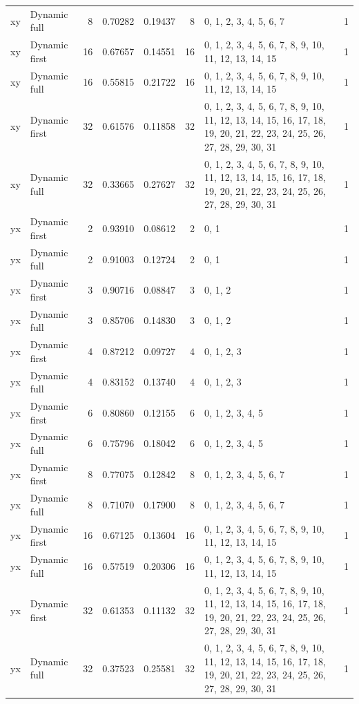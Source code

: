 \documentclass[10pt,a4paper]{article}
\begin{document}
\begin{longtable}{@{}p{23mm}p{29mm}rrrrp{36mm}r@{}}
xy & Dynamic full & 8 & 0.70282 & 0.19437 & 8 & 0, 1, 2, 3, 4, 5, 6, 7 & 1 \\
xy & Dynamic first & 16 & 0.67657 & 0.14551 & 16 & 0, 1, 2, 3, 4, 5, 6, 7, 8, 9, 10, 11, 12, 13, 14, 15 & 1 \\
xy & Dynamic full & 16 & 0.55815 & 0.21722 & 16 & 0, 1, 2, 3, 4, 5, 6, 7, 8, 9, 10, 11, 12, 13, 14, 15 & 1 \\
xy & Dynamic first & 32 & 0.61576 & 0.11858 & 32 & 0, 1, 2, 3, 4, 5, 6, 7, 8, 9, 10, 11, 12, 13, 14, 15, 16, 17, 18, 19, 20, 21, 22, 23, 24, 25, 26, 27, 28, 29, 30, 31 & 1 \\
xy & Dynamic full & 32 & 0.33665 & 0.27627 & 32 & 0, 1, 2, 3, 4, 5, 6, 7, 8, 9, 10, 11, 12, 13, 14, 15, 16, 17, 18, 19, 20, 21, 22, 23, 24, 25, 26, 27, 28, 29, 30, 31 & 1 \\
yx & Dynamic first & 2 & 0.93910 & 0.08612 & 2 & 0, 1 & 1 \\
yx & Dynamic full & 2 & 0.91003 & 0.12724 & 2 & 0, 1 & 1 \\
yx & Dynamic first & 3 & 0.90716 & 0.08847 & 3 & 0, 1, 2 & 1 \\
yx & Dynamic full & 3 & 0.85706 & 0.14830 & 3 & 0, 1, 2 & 1 \\
yx & Dynamic first & 4 & 0.87212 & 0.09727 & 4 & 0, 1, 2, 3 & 1 \\
yx & Dynamic full & 4 & 0.83152 & 0.13740 & 4 & 0, 1, 2, 3 & 1 \\
yx & Dynamic first & 6 & 0.80860 & 0.12155 & 6 & 0, 1, 2, 3, 4, 5 & 1 \\
yx & Dynamic full & 6 & 0.75796 & 0.18042 & 6 & 0, 1, 2, 3, 4, 5 & 1 \\
yx & Dynamic first & 8 & 0.77075 & 0.12842 & 8 & 0, 1, 2, 3, 4, 5, 6, 7 & 1 \\
yx & Dynamic full & 8 & 0.71070 & 0.17900 & 8 & 0, 1, 2, 3, 4, 5, 6, 7 & 1 \\
yx & Dynamic first & 16 & 0.67125 & 0.13604 & 16 & 0, 1, 2, 3, 4, 5, 6, 7, 8, 9, 10, 11, 12, 13, 14, 15 & 1 \\
yx & Dynamic full & 16 & 0.57519 & 0.20306 & 16 & 0, 1, 2, 3, 4, 5, 6, 7, 8, 9, 10, 11, 12, 13, 14, 15 & 1 \\
yx & Dynamic first & 32 & 0.61353 & 0.11132 & 32 & 0, 1, 2, 3, 4, 5, 6, 7, 8, 9, 10, 11, 12, 13, 14, 15, 16, 17, 18, 19, 20, 21, 22, 23, 24, 25, 26, 27, 28, 29, 30, 31 & 1 \\
yx & Dynamic full & 32 & 0.37523 & 0.25581 & 32 & 0, 1, 2, 3, 4, 5, 6, 7, 8, 9, 10, 11, 12, 13, 14, 15, 16, 17, 18, 19, 20, 21, 22, 23, 24, 25, 26, 27, 28, 29, 30, 31 & 1 \\
\end{longtable}\normalsize\setlength{\tabcolsep}{6pt}
\clearpage
\end{document}
